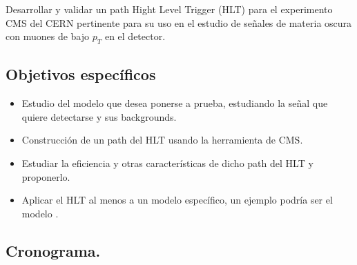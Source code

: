 Desarrollar y validar un path Hight Level Trigger (HLT) para el experimento CMS del CERN pertinente para su uso en el estudio de señales de materia oscura con muones de bajo $p_T$ en el detector.

\subsection{Objetivos específicos}

\begin{itemize}
	\item Estudio del modelo que desea ponerse a prueba, estudiando la señal que quiere detectarse y sus backgrounds.
	\item Construcción de un path del HLT usando la herramienta de CMS.
	\item Estudiar la eficiencia y otras características de dicho path del HLT y proponerlo.
	\item Aplicar el HLT al menos a un modelo específico, un ejemplo podría ser el modelo \cite{1475-7516-2016-03-048}.
\end{itemize}


\subsection{Cronograma.}

\begin{table}[h]
	\centering
\end{table}
\newpage

